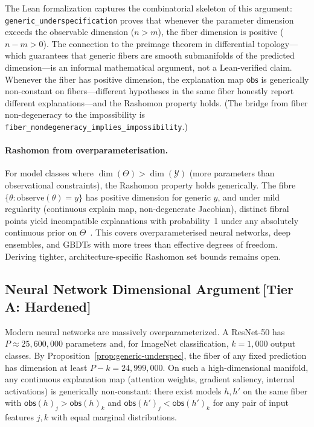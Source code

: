 \documentclass[11pt,a4paper]{article}
\begin{document}
\noindent
The Lean formalization captures the combinatorial skeleton of this argument: \texttt{generic\_underspecification} proves that whenever the parameter dimension exceeds the observable dimension ($n > m$), the fiber dimension is positive ($n - m > 0$). The connection to the preimage theorem in differential topology---which guarantees that generic fibers are smooth submanifolds of the predicted dimension---is an informal mathematical argument, not a Lean-verified claim.
Whenever the fiber has positive dimension, the explanation map
$\mathsf{obs}$ is generically non-constant on fibers---different hypotheses
in the same fiber honestly report different explanations---and the Rashomon
property holds.  (The bridge from fiber non-degeneracy to the
impossibility is \texttt{fiber\_nondegeneracy\_implies\_impossibility}.)

\paragraph{Rashomon from overparameterisation.}
For model classes where $\dim(\Theta) > \dim(\mathcal{Y})$ (more parameters than observational constraints), the Rashomon property holds generically. The fibre $\{\theta : \text{observe}(\theta) = y\}$ has positive dimension for generic $y$, and under mild regularity (continuous explain map, non-degenerate Jacobian), distinct fibral points yield incompatible explanations with probability~1 under any absolutely continuous prior on $\Theta$~\citep{damour2022underspecification}. This covers overparameterised neural networks, deep ensembles, and GBDTs with more trees than effective degrees of freedom. Deriving tighter, architecture-specific Rashomon set bounds remains open.

\subsection{Neural Network Dimensional Argument\,\textnormal{\normalsize[Tier A: Hardened]}}
\label{sec:nn-dimensional}

Modern neural networks are massively overparameterized.  A ResNet-50 has
$P \approx 25{,}600{,}000$ parameters and, for ImageNet classification,
$k = 1{,}000$ output classes.  By Proposition~\ref{prop:generic-underspec},
the fiber of any fixed prediction has dimension at least
$P - k = 24{,}999{,}000$.  On such a high-dimensional manifold, any
continuous explanation map (attention weights, gradient saliency, internal
activations) is generically non-constant: there exist models $h, h'$ on the
same fiber with $\mathsf{obs}(h)_j > \mathsf{obs}(h)_k$ and
$\mathsf{obs}(h')_j < \mathsf{obs}(h')_k$ for any pair of input features
$j, k$ with equal marginal distributions.
\end{document}
